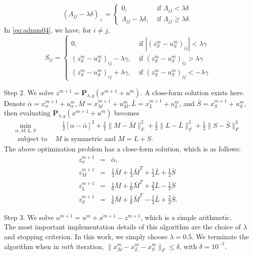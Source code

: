 \documentclass[AMS,STIX1COL]{WileyNJD-v2}
\begin{document}
$$
(\Lambda_{jj}-\lambda \delta)_+ = \left\{
\begin{array}{ll}
0, & \mbox{ if } \Lambda_{jj} < \lambda \delta \\
\Lambda_{jj}-\lambda \delta, & \mbox{ if } \Lambda_{jj} \ge \lambda \delta .
\end{array}
\right.
$$
In \eqref{eq:admm04}, we have, for $i \neq j$,
\[
S_{ij} = \left\{
\begin{array}{ll}
0, & \mbox{ if } |(z^m_S - u^m_S)_{ij}| < \lambda \gamma  \\
(z^m_S - u^m_S)_{ij}-\lambda\gamma , &
\mbox{ if } (z^m_S - u^m_S)_{ij} > \lambda \gamma \\
(z^m_S - u^m_S)_{ij}+\lambda\gamma , &
\mbox{ if } (z^m_S - u^m_S)_{ij} <- \lambda \gamma
\end{array}
\right.
\]


\noindent
Step 2. We solve $z^{m+1} = \mathbf{P}_{\lambda,g}(x^{m+1} + u^m)$.
A close-form solution exists here.
Denote
$
\bar{\alpha} = x^{m+1}_\alpha + u^m_\alpha,
\bar{M} = x^{m+1}_M + u^m_M,
\bar{L} = x^{m+1}_L + u^m_L$, and
$\bar{S} = x^{m+1}_S + u^m_S,
$
then evaluating $\mathbf{P}_{\lambda,g}(x^{m+1} + u^m)$ becomes
\begin{eqnarray*}
\min_{\alpha,M,L,S} & \quad
\frac{1}{2}[\alpha - \bar{\alpha}]^2
+ \frac{1}{2}\|M - \bar{M}\|^2_F
+ \frac{1}{2}\|L - \bar{L}\|^2_F
+ \frac{1}{2}\|S - \bar{S}\|^2_F  \\
\mbox{ subject to } & M \mbox{ is symmetric and } M=L+S.
\end{eqnarray*}
The above optimization problem has a close-form solution, which is as follows:
\begin{eqnarray*}
z^{m+1}_\alpha &=& \bar{\alpha}, \\
z^{m+1}_M &=&
\frac{1}{3} \bar{M} + \frac{1}{3} \bar{M}^T + \frac{1}{3} \bar{L} + \frac{1}{3} \bar{S} \\
z^{m+1}_L &=&
\frac{1}{6} \bar{M} + \frac{1}{6} \bar{M}^T + \frac{2}{3} \bar{L} - \frac{1}{3} \bar{S} \\
z^{m+1}_S &=&
\frac{1}{6} \bar{M} + \frac{1}{6} \bar{M}^T - \frac{1}{3} \bar{L} + \frac{2}{3} \bar{S}.
\end{eqnarray*}

\noindent
Step 3. We solve $u^{m+1} = u^m + x^{m+1} - z^{m+1}$, which is a simple arithmetic. \\

The most important implementation details of this algorithm are the choice of $\lambda$ and stopping criterion. 
In this work, we simply choose $\lambda = 0.5$. 
We terminate the algorithm  when in $mth$ iteration, $\|x^{m}_M - x^{m}_L - x^{m}_S\|_F \leq \delta$, with $\delta=10^{-7}$.
\end{document}
